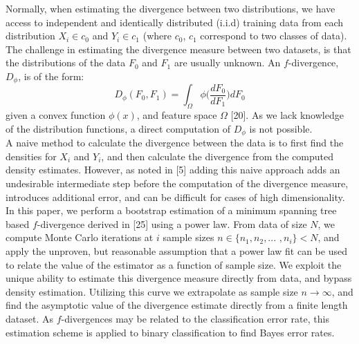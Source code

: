 \documentclass{article}
\begin{document}
	\indent Normally, when estimating the divergence between two distributions, we have access to independent and identically distributed (i.i.d) training data from each distribution $X_i \in c_0$ and $Y_i \in c_1$ (where $c_0$, $c_1$ correspond to two classes of data). The challenge in estimating the divergence measure between two datasets, is that the distributions of the data $F_0$ and $F_1$ are usually unknown. An $f$-divergence, $D_\phi$, is of the form: \begin{equation} D_\phi(F_0, F_1) = \int_{\Omega} \phi\bigg(\frac{dF_0}{dF_1}\bigg)dF_0 \end{equation} given a convex function $\phi(x)$, and feature space $\Omega$ [20].
 	As we lack knowledge of the distribution functions, a direct computation of $D_\phi$ is not possible.
 	\\ [0.5ex]
 	
 	\indent A naive method to calculate the divergence between the data is to first find the densities for $X_i$ and $Y_i$, and then calculate the divergence from the computed density estimates. However, as noted in [5] adding this naive approach adds an undesirable intermediate step before the computation of the divergence measure, introduces additional error, and can be difficult for cases of high dimensionality. 
	\\ [0.5ex]
	
	\indent	In this paper, we perform a bootstrap estimation of a minimum spanning tree based $f$-divergence derived in [25] using a power law. From data of size $N$, we compute  Monte Carlo iterations at $i$ sample sizes $n\in \{n_1, n_2,... $ $,n_i\}<N$, and apply the unproven, but reasonable assumption that a power law fit can be used to relate the value of the estimator as a function of sample size. We exploit the unique ability to estimate this divergence measure directly from data, and bypass density estimation. Utilizing this curve we extrapolate as sample size $n\rightarrow\infty$, and find the asymptotic value of the divergence estimate directly from a finite length dataset.  As $f$-divergences may be related to the classification error rate, this estimation scheme is applied to binary classification to find Bayes error rates.
 	\\ [0.5ex]
 	
\end{document}
